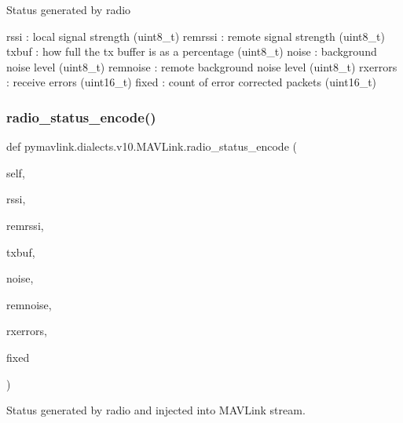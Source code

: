 \begin{DoxyVerb}
\begin{DoxyVerb}
\begin{DoxyVerb}
\begin{DoxyVerb}
\begin{DoxyVerb}Status generated by radio

rssi                      : local signal strength (uint8_t)
remrssi                   : remote signal strength (uint8_t)
txbuf                     : how full the tx buffer is as a percentage (uint8_t)
noise                     : background noise level (uint8_t)
remnoise                  : remote background noise level (uint8_t)
rxerrors                  : receive errors (uint16_t)
fixed                     : count of error corrected packets (uint16_t)\end{DoxyVerb}
 \mbox{\label{classpymavlink_1_1dialects_1_1v10_1_1MAVLink_a097cc532b2671f7a52972216689f63ad}} 
\subsubsection{\texorpdfstring{radio\+\_\+status\+\_\+encode()}{radio\_status\_encode()}}
{\footnotesize\ttfamily def pymavlink.\+dialects.\+v10.\+M\+A\+V\+Link.\+radio\+\_\+status\+\_\+encode (\begin{DoxyParamCaption}\item[{}]{self,  }\item[{}]{rssi,  }\item[{}]{remrssi,  }\item[{}]{txbuf,  }\item[{}]{noise,  }\item[{}]{remnoise,  }\item[{}]{rxerrors,  }\item[{}]{fixed }\end{DoxyParamCaption})}

\begin{DoxyVerb}Status generated by radio and injected into MAVLink stream.


\end{DoxyVerb}
\end{DoxyVerb}
\end{DoxyVerb}
\end{DoxyVerb}
\end{DoxyVerb}
